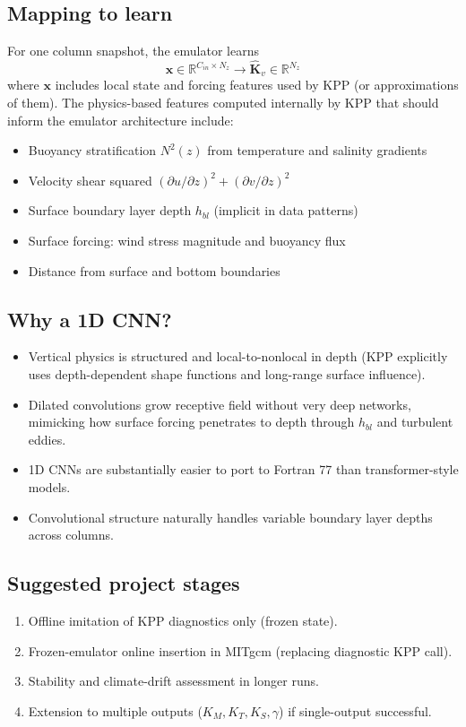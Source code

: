 \documentclass[11pt, a4paper]{article}
\begin{document}
\subsection{Mapping to learn}
For one column snapshot, the emulator learns
\begin{equation}
\mathbf{x} \in \mathbb{R}^{C_{in} \times N_z} \to \hat{\mathbf{K}}_v \in \mathbb{R}^{N_z}
\end{equation}
where $\mathbf{x}$ includes local state and forcing features used by KPP (or approximations of them). The physics-based features computed internally by KPP that should inform the emulator architecture include:
\begin{itemize}
    \item Buoyancy stratification $N^2(z)$ from temperature and salinity gradients
    \item Velocity shear squared $(\partial u/\partial z)^2 + (\partial v/\partial z)^2$
    \item Surface boundary layer depth $h_{bl}$ (implicit in data patterns)
    \item Surface forcing: wind stress magnitude and buoyancy flux
    \item Distance from surface and bottom boundaries
\end{itemize}

\subsection{Why a 1D CNN?}
\begin{itemize}
    \item Vertical physics is structured and local-to-nonlocal in depth (KPP explicitly uses depth-dependent shape functions and long-range surface influence).
    \item Dilated convolutions grow receptive field without very deep networks, mimicking how surface forcing penetrates to depth through $h_{bl}$ and turbulent eddies.
    \item 1D CNNs are substantially easier to port to Fortran 77 than transformer-style models.
    \item Convolutional structure naturally handles variable boundary layer depths across columns.
\end{itemize}

\subsection{Suggested project stages}
\begin{enumerate}
    \item Offline imitation of KPP diagnostics only (frozen state).
    \item Frozen-emulator online insertion in MITgcm (replacing diagnostic KPP call).
    \item Stability and climate-drift assessment in longer runs.
    \item Extension to multiple outputs ($K_M, K_T, K_S, \gamma$) if single-output successful.
\end{enumerate}
\end{document}
